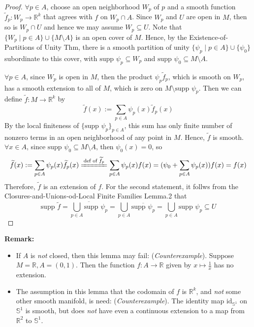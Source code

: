 \begin{proof}
    $\forall p\in A$, choose an open neighborhood $W_p$ of $p$ and a smooth function $\widetilde{f}_p:W_p \to \mathbb{R}^k$ that agrees with $f$ on $W_p\cap A$. Since $W_p$ and $U$ are open in $M$, then so is $W_p\cap U$ and hence we may assume $W_p \subseteq U$. Note that $\{W_p \mid p\in A\} \cup \{M\setminus A\}$ is an open cover of $M$. Hence, by the Existence-of-Partitions of Unity Thm, there is a smooth partition of unity $\{\psi_p\mid p\in A\} \cup \{\psi_0\}$ subordinate to this cover, with $\text{supp }\psi_p \subseteq W_p$ and $\text{supp }\psi_0 \subseteq M\setminus A$.

    $\forall p\in A$, since $W_p$ is open in $M$, then the product $\psi_p \widetilde{f}_p$, which is smooth on $W_p$, has a smooth extension to all of $M$, which is zero on $M\setminus \text{supp }\psi_p$. Then we can define $\widetilde{f}: M\to \mathbb{R}^k$ by
    \[
    \widetilde{f} (x):=\sum_{p\in A} \psi_p(x) \widetilde{f}_p(x)
    \]
    By the local finiteness of $\{\text{supp }\psi_p\}_{p\in A}$, this sum has only finite number of nonzero terms in an open neighborhood of any point in $M$. Hence, $\widetilde{f}$ is smooth. $\forall x\in A$, since $\text{supp }\psi_0 \subseteq M\setminus A$, then $\psi_0 (x)=0$, so
    \[
    \widetilde{f}(x):= \sum_{p\in A} \psi_p(x) \widetilde{f}_p (x) \xlongequal{\text{def of } \widetilde{f}_p} \sum_{p\in A} \psi_p(x) f(x)= (\psi_0+ \sum_{p\in A} \psi_p (x)) f(x)=f(x)
    \]
    Therefore, $\widetilde{f}$ is an extension of $f$. For the second statement, it follws from the Closures-and-Unions-od-Local Finite Families Lemma.2 that
    \[
    \text{supp }\widetilde{f}= \overline{\bigcup_{p\in A} \text{supp }\psi_p} =\bigcup_{p\in A} \overline{\text{supp }\psi_p}= \bigcup_{p\in A} \text{supp }\psi_p\subseteq U
    \]
\end{proof}

\noindent\textbf{Remark:} \begin{itemize}
    \item If $A$ is \textit{not} closed, then this lemma may fail: (\textit{Counterexample}). Suppose $M=\mathbb{R},A= (0,1)$. Then the function $f:A\to \mathbb{R}$ given by $x\mapsto \frac{1}{x}$ has no extension.
\item The assumption in this lemma that the codomain of $f$ is $\mathbb{R}^k$, and \textit{not} some other smooth manifold, is need: (\textit{Counterexample}). The identity map $\text{id}_{\mathbb{S}^1}$ on $\mathbb{S}^1$ is smooth, but does \textit{not} have even a continuous extension to a map from $\mathbb{R}^2$ to $\mathbb{S}^1$.
\end{itemize}

